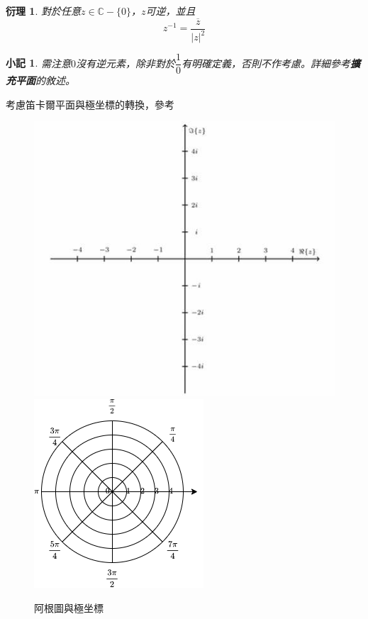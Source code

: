 \documentclass[12pt]{article}
\newtheorem*{corollary}{衍理}
\newtheorem*{remark}{小記}
\begin{document}
    \begin{corollary}
        對於任意$z\in\mathbb{C}-\{0\}$，$z$可逆，並且$$z^{-1}=\frac{\overline{z}}{|z|^2}$$
    \end{corollary}

    \begin{remark}
        需注意$0$沒有逆元素，除非對於$\dfrac{1}{0}$有明確定義，否則不作考慮。詳細參考\textbf{擴充平面}的敘述。
    \end{remark}

    考慮笛卡爾平面與極坐標的轉換，參考

    \begin{figure}[H]
        \centering
        \includegraphics[scale=0.5]{argand.jpg}
        \includegraphics[scale=0.5]{polar.png}
        \caption{阿根圖與極坐標}
    \end{figure}
\end{document}

